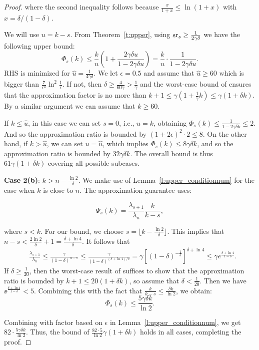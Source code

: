 \documentclass{article}
\begin{document}
\begin{proof}
  where the second inequality follows because $\frac{x}{1+x} \leq \ln (1+x)$ with $x = \delta/(1-\delta)$.  
  
  We will use $u=k-s$. From Theorem~\ref{t:upper}, using ${\mathrm{sr}}_s \geq
  \frac{1}{2\gamma\delta}$ we have the following upper bound:   
  \[ \Phi_s(k) \leq \frac{k}{u} \left(1+ \frac{2\gamma\delta u}{1 -
        2\gamma\delta u}\right)  = \frac{k}{u}\cdot
    \frac{1}{1-2\gamma\delta u}.\]
  RHS is minimized for $\hat{u}=\frac{1}{4\gamma\delta}$. We let
  $\epsilon=0.5$ and assume that
  $\hat{u}\geq 60$ which is bigger than $\frac{7}{\epsilon^4} \ln^2 \frac{1}{\epsilon}$.
If not, then $\delta\geq\frac4{60\gamma}>\frac1\gamma$ and
the  worst-case bound of \citet{pca-volume-sampling} ensures that the
approximation factor is no more than $k+1 \leq \gamma(1+\frac1\gamma
k)\leq \gamma(1+\delta k)$. By a similar argument we can assume that
$k\geq 60$.
  
If  $k  \leq \hat{u}$, in this case we can set $s=0$, i.e., $u = k$, obtaining $\Phi_s(k) \leq \frac{1}{1- 2\gamma\delta k}\leq 2$. And so the
approximation ratio is bounded by $(1+2\epsilon)^2 \cdot 2 \leq 8$. On the other
hand, if $k > \hat{u}$, we can set $u=\hat{u}$, which implies
$\Phi_s(k) \leq 8\gamma\delta k$, and so the approximation ratio is
bounded by $ 32
\gamma\delta k$. The overall bound is thus $61\gamma(1+\delta k)$
covering all possible subcases. 
  
  \bigskip
  \textbf{Case 2(b)}: $k > n - \frac{\ln 2}{\delta}$. We make use of
  Lemma~\ref{l:upper_conditionnum} for the case when $k$ is close to
  $n$. The approximation guarantee uses:  
   
  \[\Psi_s(k) = \frac{\lambda_{s+1}}{\lambda_n} \frac{k}{k-s},\]
  
where $s <k$. For our bound, we choose $s = \lfloor k- \frac{\ln
  2}{\delta}\rfloor$. This implies that $n-s < \frac{2\ln
  2}{\delta}+1=\frac{\delta+\ln4}{\delta}$. It
follows that
  \begin{align*}
    & \frac{\lambda_{s+1}}{\lambda_n}  \leq
     \frac{ \gamma}{(1-\delta)^{n-s}} \leq
      \frac{\gamma}{(1-\delta)^{(\delta+\ln 4)/\delta}} =
      \gamma\left[(1-\delta)^{-\frac{1}{\delta}}\right] ^ {\delta+\ln 4} \leq
      \gamma e^{\frac{\delta+\ln 4}{1-\delta}}. 
  \end{align*}
  If $\delta\geq \frac1{20}$, then the worst-case result of
  \citet{pca-volume-sampling} suffices to show that the approximation ratio is
  bounded by $k+1\leq 20(1+\delta k)$, so assume that
  $\delta<\frac1{20}$. Then we have $\ee^{\frac{\delta+\ln 4}{1-\delta}}<5.$
  Combining this with the fact that $\frac{k}{k-s} \leq \frac{\delta k}{\ln 2}$,
we obtain:
  \[\Phi_s(k) \leq \frac{5\gamma\delta k}{\ln 2}. \]
  
  Combining with factor based on $\epsilon$ in
  Lemma~\ref{l:upper_conditionnum}, we get $82\cdot
  \frac{5\gamma\delta k}{\ln 2}$. Thus, the bound of $\frac{82\cdot
    5}{\ln 2}\gamma(1+\delta k)$ holds in all cases, completing the proof.
\end{proof}
\end{document}
